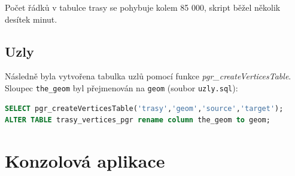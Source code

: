 \documentclass[a4paper, 12pt]{article}
\begin{document}
Počet řádků v tabulce trasy se pohybuje kolem 85 000, skript běžel několik desítek minut. 

\newpage

\subsection{Uzly}
Následně byla vytvořena tabulka uzlů pomocí funkce \textit{pgr\_createVerticesTable}. Sloupec \texttt{the\_geom} byl přejmenován na \texttt{geom} (soubor \texttt{uzly.sql}):
\begin{lstlisting}[language=sql]
SELECT pgr_createVerticesTable('trasy','geom','source','target');
ALTER TABLE trasy_vertices_pgr rename column the_geom to geom;
\end{lstlisting} 

\section{Konzolová aplikace}
\end{document}
